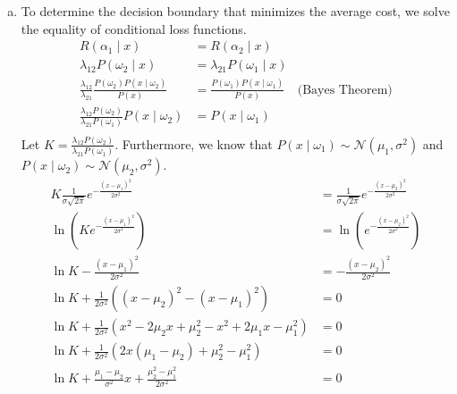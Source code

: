 \documentclass[a4paper, 10pt, twoside]{article}
\begin{document}
\begin{enumerate}[a)]
    \item To determine the decision boundary that minimizes the average cost, we solve the equality of conditional loss functions.
          \begin{align*}
              R(\alpha_1 \mid x)                                                          & = R(\alpha_2 \mid x)                                                  \\
              \lambda_{12}P(\omega_2 \mid x)                                              & = \lambda_{21}P(\omega_1 \mid x)                                      \\
              \frac{\lambda_{12}}{\lambda_{21}}\frac{P(\omega_2)P(x \mid \omega_2)}{P(x)} & = \frac{P(\omega_1)P(x \mid \omega_1)}{P(x)} & \text{(Bayes Theorem)} \\
              \frac{\lambda_{12}P(\omega_2)}{\lambda_{21}P(\omega_1)}P(x \mid \omega_2)   & = P(x \mid \omega_1)                                                  \\
          \end{align*}
          Let $K = \frac{\lambda_{12}P(\omega_2)}{\lambda_{21}P(\omega_1)}$. Furthermore, we know that $P(x \mid \omega_1) \sim \mathcal{N}(\mu_1,\sigma^{2})$ and $P(x \mid \omega_2) \sim \mathcal{N}(\mu_2,\sigma^{2})$.
          \begin{align*}
              K\frac{1}{\sigma\sqrt{2\pi}}e^{-\frac{(x-\mu_1)^2}{2\sigma^2}}            & = \frac{1}{\sigma\sqrt{2\pi}}e^{-\frac{(x-\mu_2)^2}{2\sigma^2}} \\
              \ln{(Ke^{-\frac{(x-\mu_1)^2}{2\sigma^2}})}                                & = \ln{(e^{-\frac{(x-\mu_2)^2}{2\sigma^2}})}                     \\
              \ln K - \frac{(x-\mu_1)^2}{2\sigma^2}                                     & = -\frac{(x-\mu_2)^2}{2\sigma^2}                                \\
              \ln K + \frac{1}{2\sigma^2}((x-\mu_2)^2 - (x-\mu_1)^2)                    & = 0                                                             \\
              \ln K + \frac{1}{2\sigma^2}(x^2 -2\mu_2x+\mu_2^2-x^2+2\mu_1x-\mu_1^2)     & = 0                                                             \\
              \ln K + \frac{1}{2\sigma^2}(2x(\mu_1-\mu_2)+\mu_2^2-\mu_1^2)              & = 0                                                             \\
              \ln K + \frac{\mu_1-\mu_2}{\sigma^2}x + \frac{\mu_2^2-\mu_1^2}{2\sigma^2} & = 0                                                             \\

\end{align*}
\end{enumerate}
\end{document}
